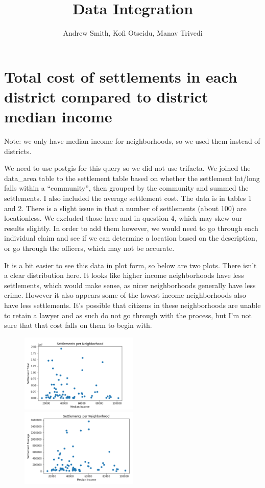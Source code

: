 \documentclass{article}
\title{Data Integration}
\author{Andrew Smith, Kofi Otseidu, Manav Trivedi}
\begin{document}
\maketitle

\section{Total cost of settlements in each district compared to district median income}

Note: we only have median income for neighborhoods, so we used them instead of districts.

We need to use postgis for this query so we did not use trifacta. We joined the data\_area table to the settlement table based on whether the settlement lat/long falls within a “community”, then grouped by the community and summed the settlements. I also included the average settlement cost. The data is in tables 1 and 2. There is a slight issue in that a number of settlements (about 100) are locationless. We excluded those here and in question 4, which may skew our results slightly. In order to add them however, we would need to go through each individual claim and see if we can determine a location based on the description, or go through the officers, which may not be accurate.

It is a bit easier to see this data in plot form, so below are two plots. There isn't a clear distribution here. It looks like higher income neighborhoods have less settlements, which would make sense, as nicer neighborhoods generally have less crime. However it also appears some of the lowest income neighborhoods also have less settlements. It's possible that citizens in these neighborhoods are unable to retain a lawyer and as such do not go through with the process, but I'm not sure that that cost falls on them to begin with.

\begin{figure}[h!]
\includegraphics[width=0.5\textwidth]{settle1.png}
\includegraphics[width=0.5\textwidth]{settle2.png}
\end{figure}
\end{document}
